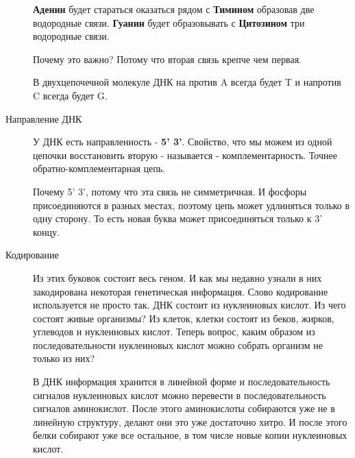 \begin{description}
\textbf{Аденин} будет стараться оказаться рядом с \textbf{Тимином} образовав две водородные
связи. \textbf{Гуанин} будет образовывать с \textbf{Цитозином} три водородные связи.

Почему это важно? Потому что вторая связь крепче чем первая.

В двухцепочечной молекуле ДНК на против A всегда будет T и
напротив C всегда будет G.


\item[Направление ДНК]

У ДНК есть направленность - \textbf{5' 3'}. Свойство, что
мы можем из одной цепочки восстановить вторую - называется - комплементарность.
Точнее обратно-комплементарная цепь. 

Почему 5' 3', потому что эта связь не симметричная. И фосфоры присоединяются в разных 
местах, поэтому цепь может удлиняться только в одну сторону. То есть новая буква 
может присоединяться только к 3' концу.

\item[Кодирование]
Из этих буковок состоит весь геном. И как мы недавно узнали в них
закодирована некоторая генетическая информация. Слово кодирование используется
не просто так. ДНК состоит из нуклеиновых кислот. Из чего состоят живые организмы?
Из клеток, клетки состоят из беков, жирков, углеводов и нуклеиновых кислот. Теперь вопрос,
каким образом из последовательности
нуклеиновых кислот можно собрать организм не только из них?

В ДНК информация хранится в линейной форме и последовательность сигналов
нуклеиновых кислот можно перевести в последовательность сигналов
аминокислот. После этого аминокислоты собираются уже не в линейную структуру,
делают они это уже достаточно хитро. И после этого белки собирают
уже все остальное, в том числе новые копии нуклеиновых кислот.

\end{description}  
